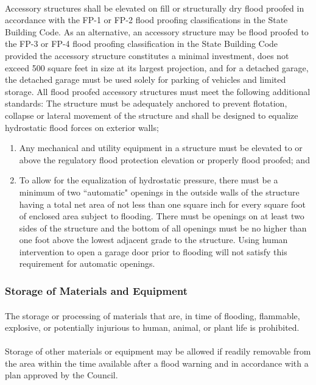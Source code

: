 \paragraph{}
Accessory structures shall be elevated on fill or structurally dry flood proofed in accordance with the FP-1 or FP-2 flood proofing classifications in the State Building Code. As an alternative, an accessory structure may be flood proofed to the FP-3 or FP-4 flood proofing classification in the State Building Code provided the accessory structure constitutes a minimal investment, does not exceed 500 square feet in size at its largest projection, and for a detached garage, the detached garage must be used solely for parking of vehicles and limited storage. All flood proofed accessory structures must meet the following additional standards: The structure must be adequately anchored to prevent flotation, collapse or lateral movement of the structure and shall be designed to equalize hydrostatic flood forces on exterior walls;
\begin{enumerate}[{\indent}1)]
    \item Any mechanical and utility equipment in a structure must be elevated to or above the regulatory flood protection elevation or properly flood proofed; and
    \item To allow for the equalization of hydrostatic pressure, there must be a minimum of two “automatic" openings in the outside walls of the structure having a total net area of not less than one square inch for every square foot of enclosed area subject to flooding. There must be openings on at least two sides of the structure and the bottom of all openings must be no higher than one foot above the lowest adjacent grade to the structure. Using human intervention to open a garage door prior to flooding will not satisfy this requirement for automatic openings.
\end{enumerate}
\subsubsection{Storage of Materials and Equipment}
\paragraph{}
The storage or processing of materials that are, in time of flooding, flammable, explosive, or potentially injurious to human, animal, or plant life is prohibited.
\paragraph{}
Storage of other materials or equipment may be allowed if readily removable from the area within the time available after a flood warning and in accordance with a plan approved by the Council.
